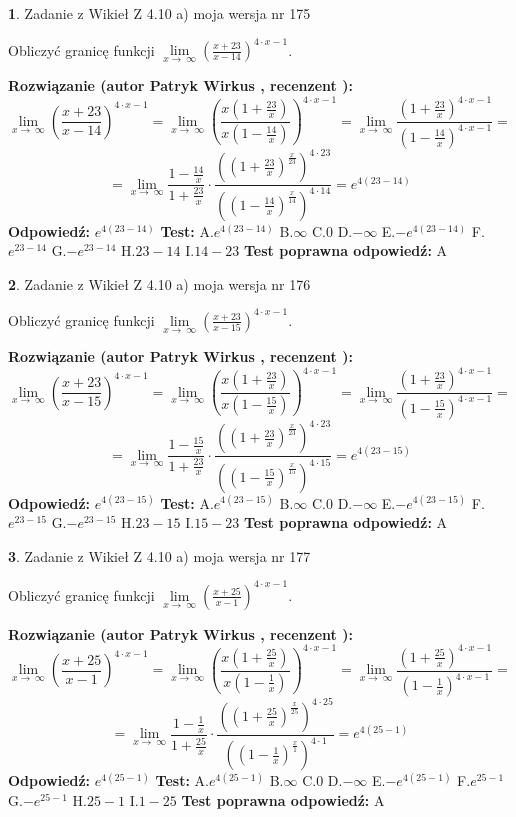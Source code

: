 \documentclass[12pt, a4paper]{article}
\theoremstyle{definition} %
\newtheorem{zad}{}
\newcommand{\zadStart}[1]{\begin{zad}#1\newline}
\newcommand{\zadStop}{\end{zad}}
\newcommand{\rozwStart}[2]{\noindent \textbf{Rozwiązanie (autor #1 , recenzent #2): }\newline}
\newcommand{\rozwStop}{\newline}
\newcommand{\odpStart}{\noindent \textbf{Odpowiedź:}\newline}
\newcommand{\odpStop}{\newline}
\newcommand{\testStart}{\noindent \textbf{Test:}\newline}
\newcommand{\testStop}{\newline}
\newcommand{\kluczStart}{\noindent \textbf{Test poprawna odpowiedź:}\newline}
\newcommand{\kluczStop}{\newline}
\begin{document}
\zadStart{Zadanie z Wikieł Z 4.10 a) moja wersja nr 175}


Obliczyć granicę funkcji  $\lim\limits_{x\to\ \infty}(\frac{x+23}{x-14})^{4\cdot x-1}$.
\zadStop
\rozwStart{Patryk Wirkus}{}
$$\lim\limits_{x\to\ \infty}(\frac{x+23}{x-14})^{4\cdot x-1} = \lim\limits_{x\to\ \infty}(\frac{x(1+\frac{23}{x})}{x(1-\frac{14}{x})})^{4\cdot x-1}=\lim\limits_{x\to\ \infty}\frac{(1+\frac{23}{x})^{4\cdot x-1}}{(1-\frac{14}{x})^{4\cdot x-1}}=$$
$$=\lim\limits_{x\to\ \infty}\frac{1-\frac{14}{x}}{1+\frac{23}{x}}\cdot\frac{((1+\frac{23}{x})^{\frac{x}{23}})^{4\cdot23}}{((1-\frac{14}{x})^{\frac{x}{14}})^{4\cdot14}}=e^{4(23-14)}$$
\rozwStop
\odpStart
$e^{4(23-14)}$
\odpStop
\testStart
A.$e^{4(23-14)}$ B.$\infty$ C.$0$ D.$-\infty$ E.$-e^{4(23-14)}$
F.$e^{23-14}$ G.$-e^{23-14}$
H.$23-14$
I.$14-23$
\testStop
\kluczStart
A
\kluczStop



\zadStart{Zadanie z Wikieł Z 4.10 a) moja wersja nr 176}


Obliczyć granicę funkcji  $\lim\limits_{x\to\ \infty}(\frac{x+23}{x-15})^{4\cdot x-1}$.
\zadStop
\rozwStart{Patryk Wirkus}{}
$$\lim\limits_{x\to\ \infty}(\frac{x+23}{x-15})^{4\cdot x-1} = \lim\limits_{x\to\ \infty}(\frac{x(1+\frac{23}{x})}{x(1-\frac{15}{x})})^{4\cdot x-1}=\lim\limits_{x\to\ \infty}\frac{(1+\frac{23}{x})^{4\cdot x-1}}{(1-\frac{15}{x})^{4\cdot x-1}}=$$
$$=\lim\limits_{x\to\ \infty}\frac{1-\frac{15}{x}}{1+\frac{23}{x}}\cdot\frac{((1+\frac{23}{x})^{\frac{x}{23}})^{4\cdot23}}{((1-\frac{15}{x})^{\frac{x}{15}})^{4\cdot15}}=e^{4(23-15)}$$
\rozwStop
\odpStart
$e^{4(23-15)}$
\odpStop
\testStart
A.$e^{4(23-15)}$ B.$\infty$ C.$0$ D.$-\infty$ E.$-e^{4(23-15)}$
F.$e^{23-15}$ G.$-e^{23-15}$
H.$23-15$
I.$15-23$
\testStop
\kluczStart
A
\kluczStop



\zadStart{Zadanie z Wikieł Z 4.10 a) moja wersja nr 177}


Obliczyć granicę funkcji  $\lim\limits_{x\to\ \infty}(\frac{x+25}{x-1})^{4\cdot x-1}$.
\zadStop
\rozwStart{Patryk Wirkus}{}
$$\lim\limits_{x\to\ \infty}(\frac{x+25}{x-1})^{4\cdot x-1} = \lim\limits_{x\to\ \infty}(\frac{x(1+\frac{25}{x})}{x(1-\frac{1}{x})})^{4\cdot x-1}=\lim\limits_{x\to\ \infty}\frac{(1+\frac{25}{x})^{4\cdot x-1}}{(1-\frac{1}{x})^{4\cdot x-1}}=$$
$$=\lim\limits_{x\to\ \infty}\frac{1-\frac{1}{x}}{1+\frac{25}{x}}\cdot\frac{((1+\frac{25}{x})^{\frac{x}{25}})^{4\cdot25}}{((1-\frac{1}{x})^{\frac{x}{1}})^{4\cdot1}}=e^{4(25-1)}$$
\rozwStop
\odpStart
$e^{4(25-1)}$
\odpStop
\testStart
A.$e^{4(25-1)}$ B.$\infty$ C.$0$ D.$-\infty$ E.$-e^{4(25-1)}$
F.$e^{25-1}$ G.$-e^{25-1}$
H.$25-1$
I.$1-25$
\testStop
\kluczStart
A
\kluczStop
\end{document}
